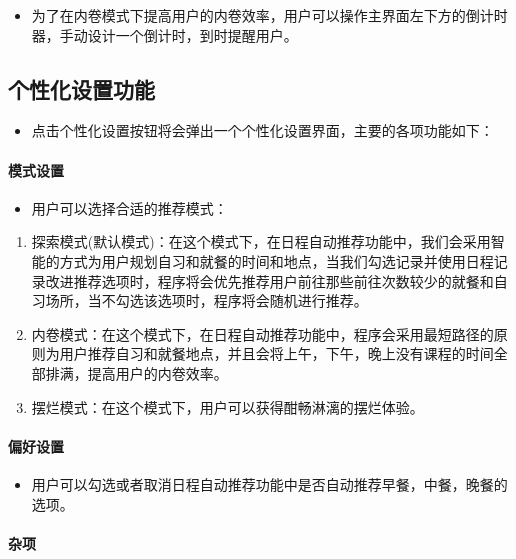 \documentclass[11pt,hyperref,a4paper,UTF8]{ctexart}
\begin{document}
\begin{CJK}{UTF8}{gkai}
\begin{itemize}
    \item 为了在内卷模式下提高用户的内卷效率，用户可以操作主界面左下方的倒计时器，手动设计一个倒计时，到时提醒用户。
\end{itemize}


\subsection{ 个性化设置功能}
\begin{itemize}
    \item 点击个性化设置按钮将会弹出一个个性化设置界面，主要的各项功能如下：
\end{itemize}

\paragraph{ 模式设置}
\begin{itemize}
    \item 用户可以选择合适的推荐模式：
\end{itemize}

\begin{enumerate}
    \item 探索模式(默认模式)：在这个模式下，在日程自动推荐功能中，我们会采用智能的方式为用户规划自习和就餐的时间和地点，当我们勾选记录并使用日程记录改进推荐选项时，程序将会优先推荐用户前往那些前往次数较少的就餐和自习场所，当不勾选该选项时，程序将会随机进行推荐。
    \item 内卷模式：在这个模式下，在日程自动推荐功能中，程序会采用最短路径的原则为用户推荐自习和就餐地点，并且会将上午，下午，晚上没有课程的时间全部排满，提高用户的内卷效率。
    \item 摆烂模式：在这个模式下，用户可以获得酣畅淋漓的摆烂体验。
\end{enumerate}

\paragraph{ 偏好设置}
\begin{itemize}
    \item 用户可以勾选或者取消日程自动推荐功能中是否自动推荐早餐，中餐，晚餐的选项。
\end{itemize}

\paragraph{ 杂项}


\end{CJK}
\end{document}
